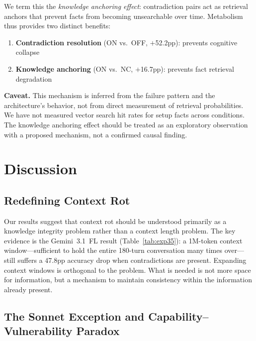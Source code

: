 \documentclass[11pt,a4paper]{article}
\begin{document}
We term this the \emph{knowledge anchoring effect}: contradiction pairs act as retrieval anchors that prevent facts from becoming unsearchable over time.
Metabolism thus provides two distinct benefits:

\begin{enumerate}\item \textbf{Contradiction resolution} (ON vs.\ OFF, $+$52.2pp): prevents cognitive collapse
\item \textbf{Knowledge anchoring} (ON vs.\ NC, $+$16.7pp): prevents fact retrieval degradation
\end{enumerate}

\textbf{Caveat.}
This mechanism is inferred from the failure pattern and the architecture's behavior, not from direct measurement of retrieval probabilities.
We have not measured vector search hit rates for setup facts across conditions.
The knowledge anchoring effect should be treated as an exploratory observation with a proposed mechanism, not a confirmed causal finding.

\section{Discussion}
\label{sec:discussion}

\subsection{Redefining Context Rot}

Our results suggest that context rot should be understood primarily as a knowledge integrity problem rather than a context length problem.
The key evidence is the Gemini~3.1~FL result (Table~\ref{tab:exp35}): a 1M-token context window---sufficient to hold the entire 180-turn conversation many times over---still suffers a 47.8pp accuracy drop when contradictions are present.
Expanding context windows is orthogonal to the problem.
What is needed is not more space for information, but a mechanism to maintain consistency within the information already present.

\subsection{The Sonnet Exception and Capability--Vulnerability Paradox}
\end{document}
